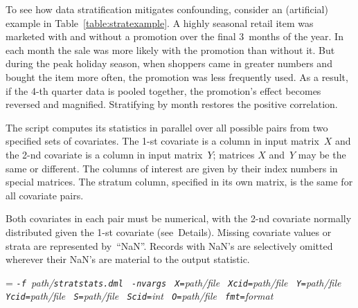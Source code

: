 To see how data stratification mitigates confounding, consider an (artificial)
example in Table~\ref{table:stratexample}.  A highly seasonal retail item
was marketed with and without a promotion over the final 3~months of the year.
In each month the sale was more likely with the promotion than without it.
But during the peak holiday season, when shoppers came in greater numbers and
bought the item more often, the promotion was less frequently used.  As a result,
if the 4-th quarter data is pooled together, the promotion's effect becomes
reversed and magnified.  Stratifying by month restores the positive correlation.

The script computes its statistics in parallel over all possible pairs from two
specified sets of covariates.  The 1-st covariate is a column in input matrix~$X$
and the 2-nd covariate is a column in input matrix~$Y$; matrices $X$ and~$Y$ may
be the same or different.  The columns of interest are given by their index numbers
in special matrices.  The stratum column, specified in its own matrix, is the same
for all covariate pairs.

Both covariates in each pair must be numerical, with the 2-nd covariate normally
distributed given the 1-st covariate (see~Details).  Missing covariate values or
strata are represented by~``NaN''.  Records with NaN's are selectively omitted
wherever their NaN's are material to the output statistic.

\smallskip
\pagebreak[3]

\smallskip

{\hangindent=\parindent\noindent\it%
{\tt{}-f }path/\/{\tt{}stratstats.dml}
{\tt{} -nvargs}
{\tt{} X=}path/file
{\tt{} Xcid=}path/file
{\tt{} Y=}path/file
{\tt{} Ycid=}path/file
{\tt{} S=}path/file
{\tt{} Scid=}int
{\tt{} O=}path/file
{\tt{} fmt=}format

}


